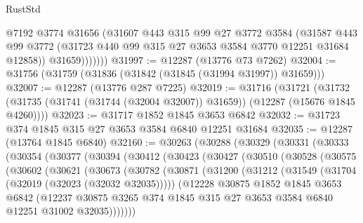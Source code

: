\begin{lexlean}{RustStd}
\begin{coremodule}
                @7192
                @3774
                @31656
                (@31607
                  @443
                  @315
                  @99
                  @27
                  @3772
                  @3584
                  (@31587
                    @443
                    @99
                    @3772
                    (@31723 @440 @99 @315 @27 @3653 @3584 @3770 @12251 @31684 @12858))
                  @31659)))))))
@31997 := @12287 (@13776 @73 @7262)
@32004 := @31756 (@31759 (@31836 (@31842 (@31845 (@31994 @31997)) @31659)))
@32007 := @12287 (@13776 @287 @7225)
@32019 := @31716
    (@31721
      (@31732 (@31735 (@31741 (@31744 (@32004 @32007)) @31659)) (@12287 (@15676 @1845 @4260))))
@32023 := @31717 @1852 @1845 @3653 @6842
@32032 := @31723 @374 @1845 @315 @27 @3653 @3584 @6840 @12251 @31684
@32035 := @12287 (@13764 @1845 @6840)
@32160 := @30263
    (@30288
      (@30329
        (@30331
          (@30333
            (@30354
              (@30377
                (@30394
                  (@30412
                    (@30423
                      (@30427
                        (@30510
                          (@30528
                            (@30575
                              (@30602
                                (@30621
                                  (@30673
                                    (@30782
                                      (@30871
                                        (@31200
                                          (@31212
                                            (@31549 (@31704 (@32019 (@32023 (@32032 @32035)))))
                                            (@12228
                                              @30875
                                              @1852
                                              @1845
                                              @3653
                                              @6842
                                              (@12237
                                                @30875
                                                @3265
                                                @374
                                                @1845
                                                @315
                                                @27
                                                @3653
                                                @3584
                                                @6840
                                                @12251
                                                @31002
                                                @32035)))))))

\end{coremodule}
\end{lexlean}
